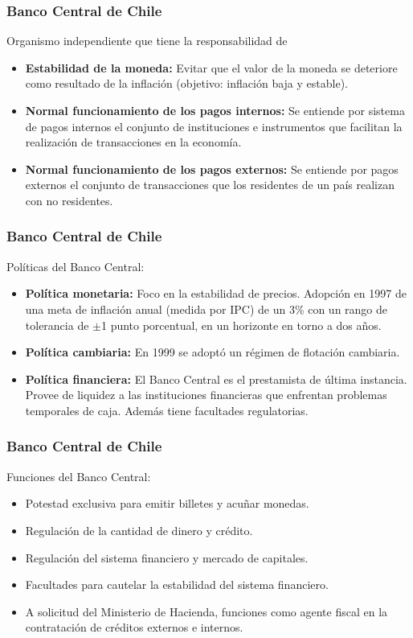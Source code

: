 \documentclass[dvipsnames,table,leqno]{beamer}
\begin{document}
		\begin{frame}
			\frametitle{Banco Central de Chile}
			Organismo independiente que tiene la responsabilidad de
			\begin{itemize}
				\item \textbf{Estabilidad de la moneda:} Evitar que el valor de la moneda se deteriore como resultado de la inflación (objetivo: inflación baja y estable).
				\item \textbf{Normal funcionamiento de los pagos internos:} Se entiende por sistema de pagos internos el conjunto de instituciones e instrumentos que facilitan la realización de transacciones en la economía.
				\item \textbf{Normal funcionamiento de los pagos externos:} Se entiende por pagos externos el conjunto de transacciones que los residentes de un país realizan con no residentes.
			\end{itemize}
		\end{frame}

		\begin{frame}
			\frametitle{Banco Central de Chile}
			Políticas del Banco Central:
			\begin{itemize}
				\item \textbf{Política monetaria:} Foco en la estabilidad de precios. Adopción en 1997 de una meta de inflación anual (medida por IPC) de un 3\% con un rango de tolerancia de $\pm$1 punto porcentual, en un horizonte en torno a dos años.
				\item \textbf{Política cambiaria:} En 1999 se adoptó un régimen de flotación cambiaria.
				\item \textbf{Política financiera:} El Banco Central es el prestamista de última instancia. Provee de liquidez a las instituciones financieras que enfrentan problemas temporales de caja. Además tiene facultades regulatorias.
			\end{itemize}
		\end{frame}

		\begin{frame}
			\frametitle{Banco Central de Chile}
			Funciones del Banco Central:
			\begin{itemize}
				\item Potestad exclusiva para emitir billetes y acuñar monedas.
				\item Regulación de la cantidad de dinero y crédito.
				\item Regulación del sistema financiero y mercado de capitales.
				\item Facultades para cautelar la estabilidad del sistema financiero.
				\item A solicitud del Ministerio de Hacienda, funciones como agente fiscal en la contratación de créditos externos e internos.
			\end{itemize}
		\end{frame}
\end{document}
